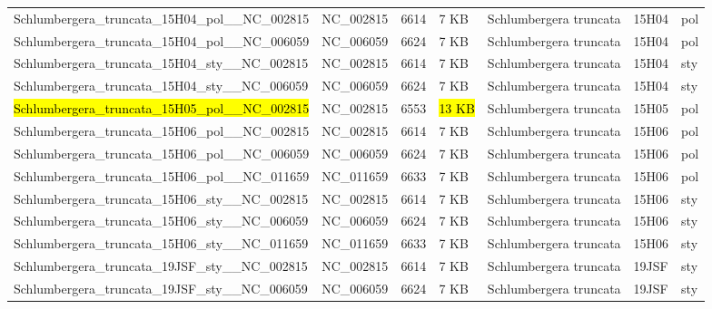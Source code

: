 \documentclass[fleqn,10pt,lineno]{wlpeerj}
\begin{document}
\begin{table}[ht]
{\begin{tabular}{@{}lllllll@{}}
Schlumbergera\_truncata\_15H04\_pol\_\_NC\_002815    & NC\_002815  & 6614            & 7 KB  & Schlumbergera truncata & 15H04        & pol          \\
Schlumbergera\_truncata\_15H04\_pol\_\_NC\_006059    & NC\_006059  & 6624            & 7 KB  & Schlumbergera truncata & 15H04        & pol          \\
Schlumbergera\_truncata\_15H04\_sty\_\_NC\_002815    & NC\_002815  & 6614            & 7 KB  & Schlumbergera truncata & 15H04        & sty          \\
Schlumbergera\_truncata\_15H04\_sty\_\_NC\_006059    & NC\_006059  & 6624            & 7 KB  & Schlumbergera truncata & 15H04        & sty          \\
\hl{Schlumbergera\_truncata\_15H05\_pol\_\_NC\_002815}    & NC\_002815  & 6553            & \hl{13 KB} & Schlumbergera truncata & 15H05        & pol          \\
Schlumbergera\_truncata\_15H06\_pol\_\_NC\_002815    & NC\_002815  & 6614            & 7 KB  & Schlumbergera truncata & 15H06        & pol          \\
Schlumbergera\_truncata\_15H06\_pol\_\_NC\_006059    & NC\_006059  & 6624            & 7 KB  & Schlumbergera truncata & 15H06        & pol          \\
Schlumbergera\_truncata\_15H06\_pol\_\_NC\_011659    & NC\_011659  & 6633            & 7 KB  & Schlumbergera truncata & 15H06        & pol          \\
Schlumbergera\_truncata\_15H06\_sty\_\_NC\_002815    & NC\_002815  & 6614            & 7 KB  & Schlumbergera truncata & 15H06        & sty          \\
Schlumbergera\_truncata\_15H06\_sty\_\_NC\_006059    & NC\_006059  & 6624            & 7 KB  & Schlumbergera truncata & 15H06        & sty          \\
Schlumbergera\_truncata\_15H06\_sty\_\_NC\_011659    & NC\_011659  & 6633            & 7 KB  & Schlumbergera truncata & 15H06        & sty          \\
Schlumbergera\_truncata\_19JSF\_sty\_\_NC\_002815    & NC\_002815  & 6614            & 7 KB  & Schlumbergera truncata & 19JSF        & sty          \\
Schlumbergera\_truncata\_19JSF\_sty\_\_NC\_006059    & NC\_006059  & 6624            & 7 KB  & Schlumbergera truncata & 19JSF        & sty          \\ \bottomrule
\end{tabular}%
}
\end{table}
\end{document}

